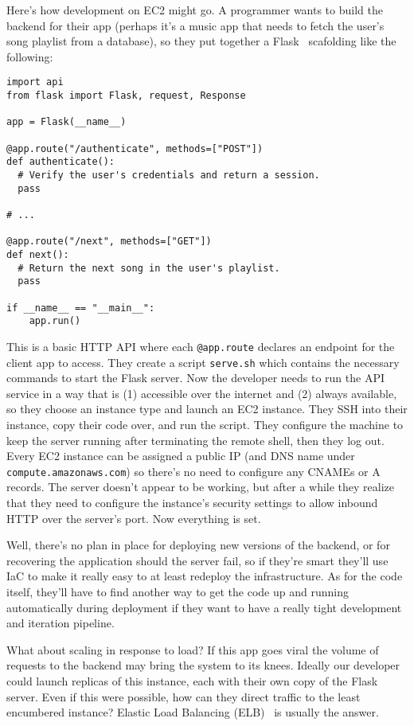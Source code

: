 \documentclass{article}
\newcommand{\icode}[1]{\texttt{#1}}
\begin{document}
Here's how development on EC2 might go.
A programmer wants to build the backend for their app (perhaps it's a music app that needs to fetch the user's song playlist from a database), so they put together a Flask~\cite{flask} scafolding like the following:

\begin{verbatim}
import api
from flask import Flask, request, Response

app = Flask(__name__)

@app.route("/authenticate", methods=["POST"])
def authenticate():
  # Verify the user's credentials and return a session.
  pass

# ...

@app.route("/next", methods=["GET"])
def next():
  # Return the next song in the user's playlist.
  pass

if __name__ == "__main__":
    app.run()
\end{verbatim}

This is a basic HTTP API where each \icode{@app.route} declares an endpoint for the client app to access.
They create a script \texttt{serve.sh} which contains the necessary commands to start the Flask server.
Now the developer needs to run the API service in a way that is (1) accessible over the internet and (2) always available, so they choose an instance type and launch an EC2 instance.
They SSH into their instance, copy their code over, and run the script.
They configure the machine to keep the server running after terminating the remote shell, then they log out.
Every EC2 instance can be assigned a public IP (and DNS name under \texttt{compute.amazonaws.com}) so there's no need to configure any CNAMEs or A records.
The server doesn't appear to be working, but after a while they realize that they need to configure the instance's security settings to allow inbound HTTP over the server's port.
Now everything is set.

Well, there's no plan in place for deploying new versions of the backend, or for recovering the application should the server fail, so if they're smart they'll use IaC to make it really easy to at least redeploy the infrastructure.
As for the code itself, they'll have to find another way to get the code up and running automatically during deployment if they want to have a really tight development and iteration pipeline.

What about scaling in response to load?
If this app goes viral the volume of requests to the backend may bring the system to its knees.
Ideally our developer could launch replicas of this instance, each with their own copy of the Flask server.
Even if this were possible, how can they direct traffic to the least encumbered instance?
Elastic Load Balancing (ELB)~\cite{ELB} is usually the answer.
\end{document}
